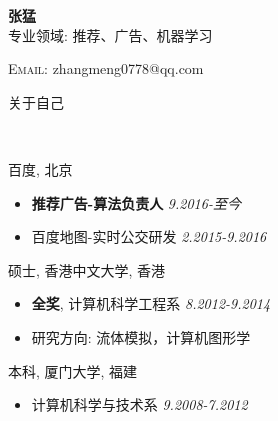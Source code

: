 \documentclass[8pt,a4paper]{article}
\newenvironment{changemargin}[2]{%
  \begin{list}{}{%
    \setlength{\topsep}{0pt}%
    \setlength{\leftmargin}{#1}%
    \setlength{\rightmargin}{#2}%
    \setlength{\listparindent}{\parindent}%
    \setlength{\itemindent}{\parindent}%
    \setlength{\parsep}{\parskip}%
  }%
  \item[]}{\end{list}
}
\newcommand{\lineover}{
	\begin{changemargin}{-0.05in}{-0.05in}
		\vspace*{-8pt}
		\hrulefill \\
		\vspace*{-2pt}
	\end{changemargin}
}
\newcommand{\header}[1]{
	\begin{changemargin}{-0.5in}{-0.5in}
		\scshape{#1}\\
  	\lineover
	\end{changemargin}
}
\newcommand{\contact}[4]{
	\begin{changemargin}{-0.5in}{-0.5in}
		\begin{center}
			{\large \scshape {#1}}\\ %
			{#2}\\ %
			{#3}\\ %
			{#4}%
		\end{center}
	\end{changemargin}
}
\newenvironment{body} {
	\vspace*{-16pt}
	\begin{changemargin}{-0.25in}{-0.5in}
  }	
	{\end{changemargin}
}
\begin{document}
\begin{minipage}[t]{0.5\textwidth}
\textbf{张猛} \\
\hfill 专业领域: 推荐、广告、机器学习\\
\end{minipage}
%
\begin{minipage}[t]{0.48\textwidth}
\textsc{Email:} zhangmeng0778@qq.com \\
\end{minipage}
\header{关于自己}

\begin{body}
	\vspace{14pt}
	百度, 北京\\
	\begin{itemize}
		\item \textbf{推荐广告-算法负责人}  \hfill \emph{9.2016-至今} \\
		\item 百度地图-实时公交研发  \hfill \emph{2.2015-9.2016} \\	
	\end{itemize}
	硕士, 香港中文大学, 香港\\
	\begin{itemize}    
    		\item \textbf{全奖}, 计算机科学工程系 \hfill \emph{8.2012-9.2014} \\
		\item 研究方向: 流体模拟，计算机图形学\\
	\end{itemize}
	本科, 厦门大学, 福建\\
	\begin{itemize}
		\item 计算机科学与技术系  \hfill \emph{9.2008-7.2012} \\
	\end{itemize}
\end{body}
\end{document}
